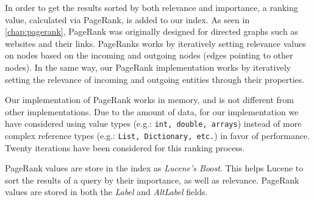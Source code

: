 In order to get the results sorted by both relevance and importance, a ranking value, calculated via PageRank, is added to our index. 
As seen in \autoref{chap:pagerank}, PageRank was originally designed for directed graphs such as websites and their links. 
PageRanks works by iteratively setting relevance values on nodes based on the incoming and outgoing nodes (edges pointing to other nodes). 
In the same way, our PageRank implementation works by iteratively setting the relevance of incoming and outgoing entities through their properties. 

Our implementation of PageRank works in memory, and is not different from other implementations. 
Due to the amount of data, for our implementation we have considered using value types (e.g.: \texttt{int, double, arrays}) instead of more complex reference types (e.g.: \texttt{List, Dictionary, etc.}) in favor of performance. 
Twenty iterations have been considered for this ranking process.

PageRank values are store in the index as \textit{Lucene's Boost}. This helps Lucene to sort the results of a query by their importance, as well as relevance. PageRank values are stored in both the \textit{Label} and \textit{AltLabel} fields.

